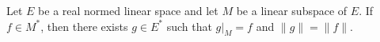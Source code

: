Let $E$ be a real normed linear space and let $M$ be a linear subspace of $E$. If $f \in M^*$, then there exists $g \in E^*$ such that $g|_M = f$ and $\|g\| = \|f\|$.
